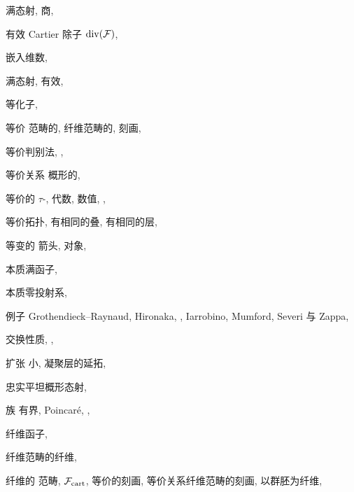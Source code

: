 \begin{theindex}
\subitem 满态射, 
\subitem 商, 
\item 有效 Cartier 除子
\subitem $\operatorname{div}(\mathcal F)$, 
\item 嵌入维数, 
\item 满态射, 
\subitem 有效, 
\item 等化子, 
\item 等价
\subitem 范畴的, 
\subitem 纤维范畴的, 
\subsubitem 刻画, 
\item 等价判别法, , 
\item 等价关系
\subitem 概形的, 
\item 等价的
\subitem $\tau$-, 
\subitem 代数, 
\subitem 数值, , 
\item 等价拓扑, 
\subitem 有相同的叠, 
\subitem 有相同的层, 
\item 等变的
\subitem 箭头, 
\subitem 对象, 
\item 本质满函子, 
\item 本质零投射系, 
\item 例子
\subitem Grothendieck--Raynaud, 
\subitem Hironaka, , 
\subitem Iarrobino, 
\subitem Mumford, 
\subitem Severi 与 Zappa, 
\item 交换性质, , 
\item 扩张
\subitem 小, 
\subitem 凝聚层的延拓, 
\indexspace
\item 忠实平坦概形态射, 
\item 族
\subitem 有界, 
\subitem Poincaré, , 
\item 纤维函子, 
\item 纤维范畴的纤维, 
\item 纤维的
\subitem 范畴, 
\subsubitem $\mathcal F_{\mathrm{cart}}$, 
\subsubitem 等价的刻画, 
\subsubitem 等价关系纤维范畴的刻画, 
\subsubitem 以群胚为纤维, 

\end{theindex}
